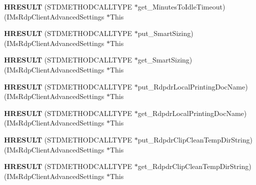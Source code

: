 \begin{DoxyCompactItemize}
{\bfseries H\+R\+E\+S\+U\+LT} (S\+T\+D\+M\+E\+T\+H\+O\+D\+C\+A\+L\+L\+T\+Y\+PE $\ast$get\+\_\+\+Minutes\+To\+Idle\+Timeout)(I\+Ms\+Rdp\+Client\+Advanced\+Settings $\ast$This
\item 
\mbox{\label{struct_i_ms_rdp_client_advanced_settings_vtbl_a0359bf41d2a76b0db90d839dfcecd4a9}} 
{\bfseries H\+R\+E\+S\+U\+LT} (S\+T\+D\+M\+E\+T\+H\+O\+D\+C\+A\+L\+L\+T\+Y\+PE $\ast$put\+\_\+\+Smart\+Sizing)(I\+Ms\+Rdp\+Client\+Advanced\+Settings $\ast$This
\item 
\mbox{\label{struct_i_ms_rdp_client_advanced_settings_vtbl_a77fca2806056e6d772302bdc69e2babb}} 
{\bfseries H\+R\+E\+S\+U\+LT} (S\+T\+D\+M\+E\+T\+H\+O\+D\+C\+A\+L\+L\+T\+Y\+PE $\ast$get\+\_\+\+Smart\+Sizing)(I\+Ms\+Rdp\+Client\+Advanced\+Settings $\ast$This
\item 
\mbox{\label{struct_i_ms_rdp_client_advanced_settings_vtbl_a881961e92c71c2e8b68e8dd189472237}} 
{\bfseries H\+R\+E\+S\+U\+LT} (S\+T\+D\+M\+E\+T\+H\+O\+D\+C\+A\+L\+L\+T\+Y\+PE $\ast$put\+\_\+\+Rdpdr\+Local\+Printing\+Doc\+Name)(I\+Ms\+Rdp\+Client\+Advanced\+Settings $\ast$This
\item 
\mbox{\label{struct_i_ms_rdp_client_advanced_settings_vtbl_add466e7e764777a95c35212abdfb76a3}} 
{\bfseries H\+R\+E\+S\+U\+LT} (S\+T\+D\+M\+E\+T\+H\+O\+D\+C\+A\+L\+L\+T\+Y\+PE $\ast$get\+\_\+\+Rdpdr\+Local\+Printing\+Doc\+Name)(I\+Ms\+Rdp\+Client\+Advanced\+Settings $\ast$This
\item 
\mbox{\label{struct_i_ms_rdp_client_advanced_settings_vtbl_adbc134d1f78e378784cf34026dc1cfdf}} 
{\bfseries H\+R\+E\+S\+U\+LT} (S\+T\+D\+M\+E\+T\+H\+O\+D\+C\+A\+L\+L\+T\+Y\+PE $\ast$put\+\_\+\+Rdpdr\+Clip\+Clean\+Temp\+Dir\+String)(I\+Ms\+Rdp\+Client\+Advanced\+Settings $\ast$This
\item 
\mbox{\label{struct_i_ms_rdp_client_advanced_settings_vtbl_adbab57228c2e6b3166db331459f129ff}} 
{\bfseries H\+R\+E\+S\+U\+LT} (S\+T\+D\+M\+E\+T\+H\+O\+D\+C\+A\+L\+L\+T\+Y\+PE $\ast$get\+\_\+\+Rdpdr\+Clip\+Clean\+Temp\+Dir\+String)(I\+Ms\+Rdp\+Client\+Advanced\+Settings $\ast$This

\end{DoxyCompactItemize}
